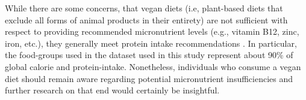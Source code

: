 \documentclass{article}
\begin{document}
While there are some concerns, that vegan diets (i.e, plant-based diets that exclude all forms of animal products in their entirety) are not sufficient with respect to providing recommended micronutrient levels (e.g., vitamin B12, zinc, iron, etc.), they generally meet protein intake recommendations \cite{WHO2021}. In particular, the food-groups  used in the dataset used in this study represent   about 90\% of global calorie and protein-intake. Nonetheless, individuals who consume a vegan diet should remain aware regarding potential micronutrient insufficiencies and further research on that end would certainly be insightful.

  
{\small


}
\end{document}

